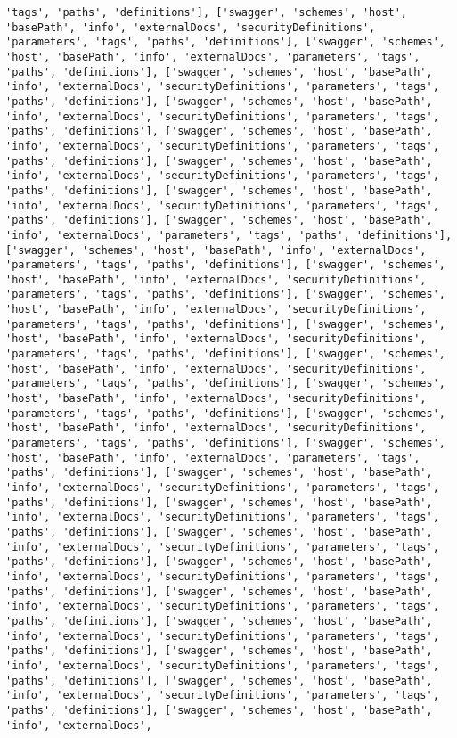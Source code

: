 \documentclass[11pt]{article}
\begin{document}
\begin{Verbatim}[commandchars=\\\{\}]
'tags', 'paths', 'definitions'], ['swagger', 'schemes', 'host', 'basePath', 'info', 'externalDocs', 'securityDefinitions', 'parameters', 'tags', 'paths', 'definitions'], ['swagger', 'schemes', 'host', 'basePath', 'info', 'externalDocs', 'parameters', 'tags', 'paths', 'definitions'], ['swagger', 'schemes', 'host', 'basePath', 'info', 'externalDocs', 'securityDefinitions', 'parameters', 'tags', 'paths', 'definitions'], ['swagger', 'schemes', 'host', 'basePath', 'info', 'externalDocs', 'securityDefinitions', 'parameters', 'tags', 'paths', 'definitions'], ['swagger', 'schemes', 'host', 'basePath', 'info', 'externalDocs', 'securityDefinitions', 'parameters', 'tags', 'paths', 'definitions'], ['swagger', 'schemes', 'host', 'basePath', 'info', 'externalDocs', 'securityDefinitions', 'parameters', 'tags', 'paths', 'definitions'], ['swagger', 'schemes', 'host', 'basePath', 'info', 'externalDocs', 'securityDefinitions', 'parameters', 'tags', 'paths', 'definitions'], ['swagger', 'schemes', 'host', 'basePath', 'info', 'externalDocs', 'parameters', 'tags', 'paths', 'definitions'], ['swagger', 'schemes', 'host', 'basePath', 'info', 'externalDocs', 'parameters', 'tags', 'paths', 'definitions'], ['swagger', 'schemes', 'host', 'basePath', 'info', 'externalDocs', 'securityDefinitions', 'parameters', 'tags', 'paths', 'definitions'], ['swagger', 'schemes', 'host', 'basePath', 'info', 'externalDocs', 'securityDefinitions', 'parameters', 'tags', 'paths', 'definitions'], ['swagger', 'schemes', 'host', 'basePath', 'info', 'externalDocs', 'securityDefinitions', 'parameters', 'tags', 'paths', 'definitions'], ['swagger', 'schemes', 'host', 'basePath', 'info', 'externalDocs', 'securityDefinitions', 'parameters', 'tags', 'paths', 'definitions'], ['swagger', 'schemes', 'host', 'basePath', 'info', 'externalDocs', 'securityDefinitions', 'parameters', 'tags', 'paths', 'definitions'], ['swagger', 'schemes', 'host', 'basePath', 'info', 'externalDocs', 'securityDefinitions', 'parameters', 'tags', 'paths', 'definitions'], ['swagger', 'schemes', 'host', 'basePath', 'info', 'externalDocs', 'parameters', 'tags', 'paths', 'definitions'], ['swagger', 'schemes', 'host', 'basePath', 'info', 'externalDocs', 'securityDefinitions', 'parameters', 'tags', 'paths', 'definitions'], ['swagger', 'schemes', 'host', 'basePath', 'info', 'externalDocs', 'securityDefinitions', 'parameters', 'tags', 'paths', 'definitions'], ['swagger', 'schemes', 'host', 'basePath', 'info', 'externalDocs', 'securityDefinitions', 'parameters', 'tags', 'paths', 'definitions'], ['swagger', 'schemes', 'host', 'basePath', 'info', 'externalDocs', 'securityDefinitions', 'parameters', 'tags', 'paths', 'definitions'], ['swagger', 'schemes', 'host', 'basePath', 'info', 'externalDocs', 'securityDefinitions', 'parameters', 'tags', 'paths', 'definitions'], ['swagger', 'schemes', 'host', 'basePath', 'info', 'externalDocs', 'securityDefinitions', 'parameters', 'tags', 'paths', 'definitions'], ['swagger', 'schemes', 'host', 'basePath', 'info', 'externalDocs', 'securityDefinitions', 'parameters', 'tags', 'paths', 'definitions'], ['swagger', 'schemes', 'host', 'basePath', 'info', 'externalDocs', 'securityDefinitions', 'parameters', 'tags', 'paths', 'definitions'], ['swagger', 'schemes', 'host', 'basePath', 'info', 'externalDocs', 
\end{Verbatim}
\end{document}
